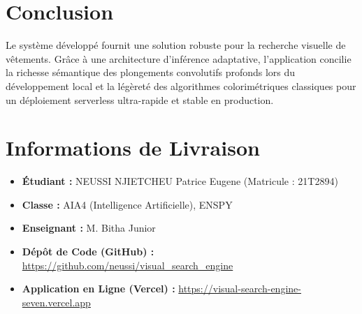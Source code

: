 \documentclass[12pt,a4paper]{article}
\begin{document}
\section{Conclusion}
Le système développé fournit une solution robuste pour la recherche visuelle de vêtements. Grâce à une architecture d'inférence adaptative, l'application concilie la richesse sémantique des plongements convolutifs profonds lors du développement local et la légèreté des algorithmes colorimétriques classiques pour un déploiement serverless ultra-rapide et stable en production.

\newpage
\section*{Informations de Livraison}
\begin{itemize}
    \item \textbf{Étudiant :} NEUSSI NJIETCHEU Patrice Eugene (Matricule : 21T2894)
    \item \textbf{Classe :} AIA4 (Intelligence Artificielle), ENSPY
    \item \textbf{Enseignant :} M. Bitha Junior
    \item \textbf{Dépôt de Code (GitHub) :} \url{https://github.com/neussi/visual_search_engine}
    \item \textbf{Application en Ligne (Vercel) :} \url{https://visual-search-engine-seven.vercel.app}
\end{itemize}
\end{document}
